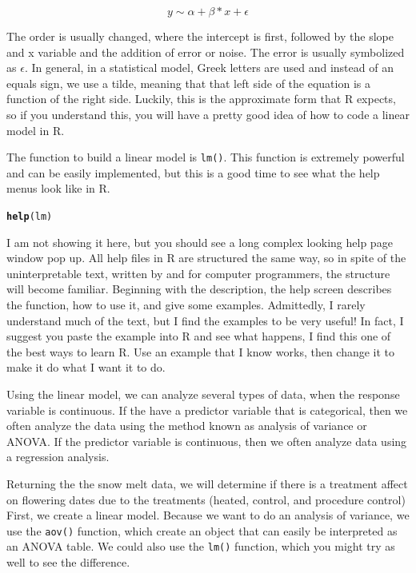 \documentclass{tufte-handout}\usepackage[]{graphicx}\usepackage[]{color}
\makeatletter
\newcommand{\hlstd}[1]{\textcolor[rgb]{0.345,0.345,0.345}{#1}}%
\newcommand{\hlkwd}[1]{\textcolor[rgb]{0.737,0.353,0.396}{\textbf{#1}}}%
\newenvironment{kframe}{%
 \def\at@end@of@kframe{}%
 \ifinner\ifhmode%
  \def\at@end@of@kframe{\end{minipage}}%
  \begin{minipage}{\columnwidth}%
 \fi\fi%
 \def\FrameCommand##1{\hskip\@totalleftmargin \hskip-\fboxsep
 \colorbox{shadecolor}{##1}\hskip-\fboxsep
     \hskip-\linewidth \hskip-\@totalleftmargin \hskip\columnwidth}%
 \MakeFramed {\advance\hsize-\width
   \@totalleftmargin\z@ \linewidth\hsize
   \@setminipage}}%
 {\par\unskip\endMakeFramed%
 \at@end@of@kframe}
\newenvironment{knitrout}{}{} %
\makeatother
\begin{document}
\begin{equation}
y \sim \alpha + \beta * x + \epsilon
\end{equation}

The order is usually changed, where the intercept is first, followed by the slope and x variable and the addition of error or noise. The error is usually symbolized as $\epsilon$. In general, in a statistical model, Greek letters are used and instead of an equals sign, we use a tilde, meaning that that left side of the equation is a function of the right side. Luckily, this is the approximate form that R expects, so if you understand this, you will have a pretty good idea of how to code a linear model in R. 

The function to build a linear model is \texttt{lm()}. This function is extremely powerful and can be easily implemented, but this is a good time to see what the help menus look like in R. 

\begin{knitrout}
\color{fgcolor}\begin{kframe}
\begin{alltt}
\hlkwd{help}\hlstd{(lm)}
\end{alltt}
\end{kframe}
\end{knitrout}

I am not showing it here, but you should see a long complex looking help page window pop up. All help files in R are structured the same way, so in spite of the uninterpretable text, written by and for computer programmers, the structure will become familiar. Beginning with the description, the help screen describes the function, how to use it, and give some examples. Admittedly, I rarely understand much of the text, but I find the examples to be very useful! In fact, I suggest you paste the example into R and see what happens, I find this one of the best ways to learn R. Use an example that I know works, then change it to make it do what I want it to do.

Using the linear model, we can analyze several types of data, when the response variable is continuous. If the have a predictor variable that is categorical, then we often analyze the data using the method known as analysis of variance or ANOVA. If the predictor variable is continuous, then we often analyze data using a regression analysis. 

Returning the the snow melt data, we will determine if there is a treatment affect on flowering dates due to the treatments (heated, control, and procedure control) First, we create a linear model. Because we want to do an analysis of variance, we use the \texttt{aov()} function, which create an object that can easily be interpreted as an ANOVA table. We could also use the \texttt{lm()} function, which you might try as well to see the difference. 
\end{document}
